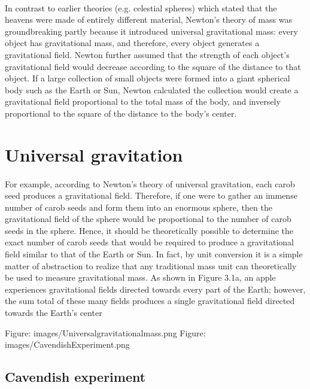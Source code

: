 \documentclass{book}
\begin{document}
	\paragraph{}
	In contrast to earlier theories (e.g. celestial spheres) which stated that the heavens were made of entirely different material, Newton's theory of mass was groundbreaking partly because it introduced universal gravitational mass: every object has gravitational mass, and therefore, every object generates a gravitational field. Newton further assumed that the strength of each object's gravitational field would decrease according to the square of the distance to that object. If a large collection of small objects were formed into a giant spherical body such as the Earth or Sun, Newton calculated the collection would create a gravitational field proportional to the total mass of the body, and inversely proportional to the square of the distance to the body's center.
	
	\section{Universal gravitation}
	\paragraph{}
	For example, according to Newton's theory of universal gravitation, each carob seed produces a gravitational field. Therefore, if one were to gather an immense number of carob seeds and form them into an enormous sphere, then the gravitational field of the sphere would be proportional to the number of carob seeds in the sphere. Hence, it should be theoretically possible to determine the exact number of carob seeds that would be required to produce a gravitational field similar to that of the Earth or Sun. In fact, by unit conversion it is a simple matter of abstraction to realize that any traditional mass unit can theoretically be used to measure gravitational mass. As shown in Figure 3.1a, an apple experiences gravitational fields directed towards every part of the Earth; however, the sum total of these many fields produces a single gravitational field directed towards the Earth's center
	
	Figure: images/Universalgravitationalmass.png
	Figure: images/CavendishExperiment.png
	
	\subsection{Cavendish experiment}
\end{document}
